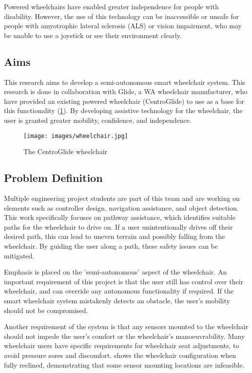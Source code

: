Powered wheelchairs have enabled greater independence for people with disability.
However, the use of this technology can be inaccessible or unsafe for people
with amyotrophic lateral sclerosis (ALS) or vision impairment,
who may be unable to use a joystick or see their environment clearly.

\subsection{Aims}
This research aims to develop a semi-autonomous smart wheelchair system.
This research is done in collaboration with Glide, a WA wheelchair manufacturer,
who have provided an existing powered wheelchair (CentroGlide) to use as a base
for this functionality (\cref{fig:wheelchair}). By developing assistive technology for the wheelchair,
the user is granted greater mobility, confidence, and independence.

\begin{figure}[H]
    \centering
    \texttt{[image: images/wheelchair.jpg]}
    \caption{The CentroGlide wheelchair}
    \label{fig:wheelchair}
\end{figure}

\pagebreak
\subsection{Problem Definition}
Multiple engineering project students are part of this team
and are working on elements such as controller design, navigation assistance, and object detection.
This work specifically focuses on pathway assistance, which identifies suitable
paths for the wheelchair to drive on. If a user unintentionally drives off their desired path,
this can lead to uneven terrain and possibly falling from the wheelchair.
By guiding the user along a path, these safety issues can be mitigated.

Emphasis is placed on the 'semi-autonomous' aspect of the wheelchair.
An important requirement of this project is that the user still
has control over their wheelchair, and can override any autonomous functionality
if required. If the smart wheelchair system mistakenly detects an obstacle,
the user's mobility should not be compromised.

Another requirement of the system is that any sensors mounted to the wheelchair
should not impede the user's comfort or the wheelchair's manoeuvrability.
Many wheelchair users have specific requirements for wheelchair seat adjustments,
to avoid pressure sores and discomfort.  shows the
wheelchair configuration when fully reclined, demonstrating that some sensor mounting locations
are infeasible.

